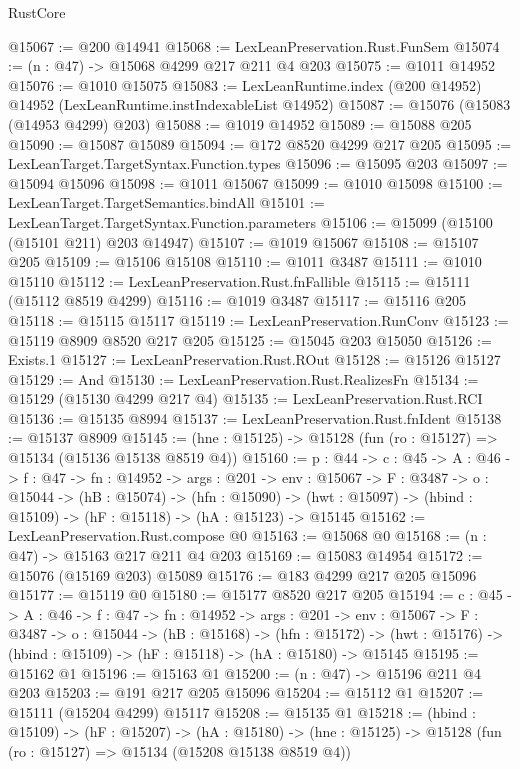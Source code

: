 \begin{lexlean}{RustCore}
\begin{coremodule}
@15067 := @200 @14941
@15068 := LexLeanPreservation.Rust.FunSem
@15074 := (n : @47) -> @15068 @4299 @217 @211 @4 @203
@15075 := @1011 @14952
@15076 := @1010 @15075
@15083 := LexLeanRuntime.index (@200 @14952) @14952 (LexLeanRuntime.instIndexableList @14952)
@15087 := @15076 (@15083 (@14953 @4299) @203)
@15088 := @1019 @14952
@15089 := @15088 @205
@15090 := @15087 @15089
@15094 := @172 @8520 @4299 @217 @205
@15095 := LexLeanTarget.TargetSyntax.Function.types
@15096 := @15095 @203
@15097 := @15094 @15096
@15098 := @1011 @15067
@15099 := @1010 @15098
@15100 := LexLeanTarget.TargetSemantics.bindAll
@15101 := LexLeanTarget.TargetSyntax.Function.parameters
@15106 := @15099 (@15100 (@15101 @211) @203 @14947)
@15107 := @1019 @15067
@15108 := @15107 @205
@15109 := @15106 @15108
@15110 := @1011 @3487
@15111 := @1010 @15110
@15112 := LexLeanPreservation.Rust.fnFallible
@15115 := @15111 (@15112 @8519 @4299)
@15116 := @1019 @3487
@15117 := @15116 @205
@15118 := @15115 @15117
@15119 := LexLeanPreservation.RunConv
@15123 := @15119 @8909 @8520 @217 @205
@15125 := @15045 @203 @15050
@15126 := Exists.{1}
@15127 := LexLeanPreservation.Rust.ROut
@15128 := @15126 @15127
@15129 := And
@15130 := LexLeanPreservation.Rust.RealizesFn
@15134 := @15129 (@15130 @4299 @217 @4)
@15135 := LexLeanPreservation.Rust.RCI
@15136 := @15135 @8994
@15137 := LexLeanPreservation.Rust.fnIdent
@15138 := @15137 @8909
@15145 := (hne : @15125) -> @15128 (fun (ro : @15127) => @15134 (@15136 @15138 @8519 @4))
@15160 := {p : @44} ->
  {c : @45} ->
  {A : @46} ->
  {f : @47} ->
  {fn : @14952} ->
  {args : @201} ->
  {env : @15067} ->
  {F : @3487} ->
  {o : @15044} ->
  (hB : @15074) ->
  (hfn : @15090) -> (hwt : @15097) -> (hbind : @15109) -> (hF : @15118) -> (hA : @15123) -> @15145
@15162 := LexLeanPreservation.Rust.compose @0
@15163 := @15068 @0
@15168 := (n : @47) -> @15163 @217 @211 @4 @203
@15169 := @15083 @14954
@15172 := @15076 (@15169 @203) @15089
@15176 := @183 @4299 @217 @205 @15096
@15177 := @15119 @0
@15180 := @15177 @8520 @217 @205
@15194 := {c : @45} ->
  {A : @46} ->
  {f : @47} ->
  {fn : @14952} ->
  {args : @201} ->
  {env : @15067} ->
  {F : @3487} ->
  {o : @15044} ->
  (hB : @15168) ->
  (hfn : @15172) -> (hwt : @15176) -> (hbind : @15109) -> (hF : @15118) -> (hA : @15180) -> @15145
@15195 := @15162 @1
@15196 := @15163 @1
@15200 := (n : @47) -> @15196 @211 @4 @203
@15203 := @191 @217 @205 @15096
@15204 := @15112 @1
@15207 := @15111 (@15204 @4299) @15117
@15208 := @15135 @1
@15218 := (hbind : @15109) ->
  (hF : @15207) ->
  (hA : @15180) -> (hne : @15125) -> @15128 (fun (ro : @15127) => @15134 (@15208 @15138 @8519 @4))

\end{coremodule}
\end{lexlean}

